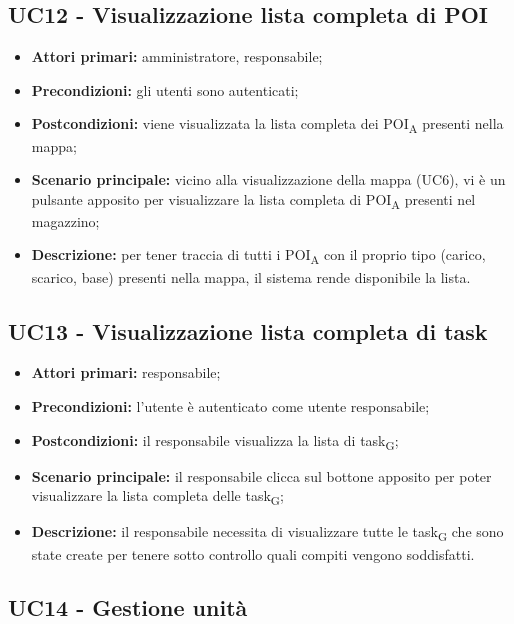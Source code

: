 \subsection{UC12 - Visualizzazione lista completa di POI}
\begin{itemize}
	\item 	\textbf{Attori primari:} amministratore, responsabile;
	\item 	\textbf{Precondizioni:} gli utenti sono autenticati;
	\item 	\textbf{Postcondizioni:} viene visualizzata la lista completa dei POI\textsubscript{A} presenti nella mappa;
	\item 	\textbf{Scenario principale:} vicino alla visualizzazione della mappa (UC6), vi è un pulsante apposito per visualizzare la lista completa di POI\textsubscript{A} presenti nel magazzino;
	\item 	\textbf{Descrizione:} per tener traccia di tutti i POI\textsubscript{A} con il proprio tipo (carico, scarico, base) presenti nella mappa, il sistema rende disponibile la lista.

\end{itemize}

\subsection{UC13 - Visualizzazione lista completa di task}
\begin{itemize}
	\item 	\textbf{Attori primari:} responsabile;
	\item 	\textbf{Precondizioni:} l'utente è autenticato come utente responsabile;
	\item 	\textbf{Postcondizioni:} il responsabile visualizza la lista di task\textsubscript{G};
	\item 	\textbf{Scenario principale:} il responsabile clicca sul bottone apposito per poter visualizzare la lista completa delle task\textsubscript{G};
	\item 	\textbf{Descrizione:} il responsabile necessita di visualizzare tutte le task\textsubscript{G} che sono state create per tenere sotto controllo quali compiti vengono soddisfatti.

\end{itemize}

\subsection{UC14 - Gestione unità}

